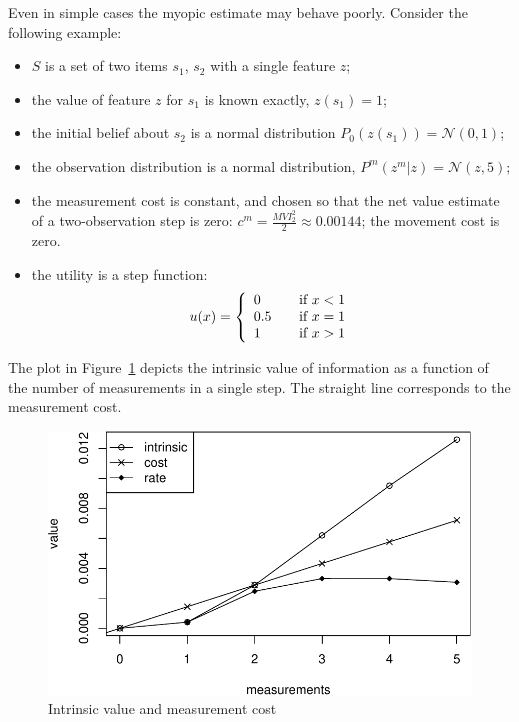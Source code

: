 Even in simple cases the myopic estimate may behave poorly.  Consider
the following example:
\begin {itemize}
\item $S$ is a set of two items $s_1$, $s_2$ with a single feature $z$; 
\item the value of feature $z$ for $s_1$ is known exactly, $z(s_1)=1$;
\item the initial belief about $s_2$ is a normal distribution $P_0(z(s_1))=\mathcal{N}(0,1)$;
\item the observation distribution is a normal distribution, $P^m(z^m|z)=\mathcal{N}(z, 5)$;
\item the measurement cost is constant, and chosen so that the net
  value estimate of a two-observation step is zero: $c^m=\frac {MVI_2^2} 2\approx
  0.00144$; the movement cost is zero.
\item the utility is a step function:
\[u(x) = \left\{ 
\begin{array}{l l}
  0 & \quad \mbox{if $x<1$}\\
  0.5 & \quad \mbox{if $x=1$}\\
  1 & \quad \mbox{if $x>1$}\\
\end{array} \right.
 \]
\end {itemize}

The plot in Figure~\ref{fig:greedy-mvilim-value-cost} depicts the intrinsic
value of information as a function of the number of measurements in a single
step. The straight line corresponds to the measurement cost.

\begin{figure}[h]
\centering
\includegraphics[scale=0.48]{mvilim-value-cost.pdf}
\caption{Intrinsic value and measurement cost} 
\label{fig:greedy-mvilim-value-cost}
\end{figure} 

